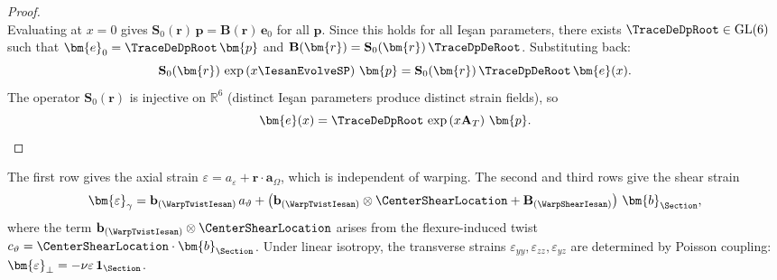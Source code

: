 \begin{proof}
\begin{equation*}
\end{equation*}
Evaluating at $x = 0$ gives $\mathbf{S}_0(\bm{r})\,\bm{p} = \mathbf{B}(\bm{r})\,\bm{e}_0$ 
for all $\bm{p}$. Since this holds for all Ieşan parameters, there exists 
$\TraceDeDpRoot \in \mathrm{GL}(6)$ such that $\bm{e}_0 = \TraceDeDpRoot\,\bm{p}$ 
and $\mathbf{B}(\bm{r}) = \mathbf{S}_0(\bm{r})\,\TraceDpDeRoot$. 
%
Substituting back:
\begin{equation*}
\mathbf{S}_0(\bm{r})\,\exp\left(x\IesanEvolveSP\right)\,\bm{p} 
= \mathbf{S}_0(\bm{r})\,\TraceDpDeRoot\,\bm{e}(x).
\end{equation*}
The operator $\mathbf{S}_0(\bm{r})$ is injective on $\mathbb{R}^6$ 
(distinct Ieşan parameters produce distinct strain fields), so
\begin{equation*}
\bm{e}(x) = \TraceDeDpRoot\,\exp\left(x\mathbf{A}_T\right)\,\bm{p}. 
\qedhere
\end{equation*}
\end{proof}

The first row gives the axial strain $\varepsilon = a_\varepsilon + \bm{r} \cdot \bm{a}_\Omega$, 
which is independent of warping. The second and third rows give the shear strain
\begin{equation*}
\bm{\varepsilon}_\gamma = \mathbf{b}_{(\WarpTwistIesan)} \,a_\vartheta
+ \left(\mathbf{b}_{(\WarpTwistIesan)} \otimes \CenterShearLocation + \mathbf{B}_{(\WarpShearIesan)}\right)\,\bm{b}_{\Section},
\end{equation*}
where the term $\mathbf{b}_{(\WarpTwistIesan)} \otimes \CenterShearLocation$ arises from 
the flexure-induced twist $c_\vartheta = \CenterShearLocation \cdot \bm{b}_{\Section}$. 
Under linear isotropy, the transverse strains $\varepsilon_{yy}, \varepsilon_{zz}, \varepsilon_{yz}$ 
are determined by Poisson coupling: 
$\bm{\varepsilon}_\perp = -\nu\varepsilon\,\mathbf{1}_\Section$.
